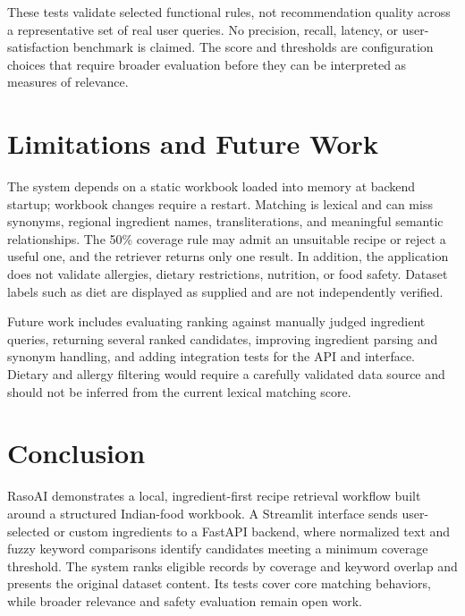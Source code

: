 \documentclass[conference]{IEEEtran}
\begin{document}
These tests validate selected functional rules, not recommendation quality across a representative set of real user queries. No precision, recall, latency, or user-satisfaction benchmark is claimed. The score and thresholds are configuration choices that require broader evaluation before they can be interpreted as measures of relevance.

\section{Limitations and Future Work}
The system depends on a static workbook loaded into memory at backend startup; workbook changes require a restart. Matching is lexical and can miss synonyms, regional ingredient names, transliterations, and meaningful semantic relationships. The 50\% coverage rule may admit an unsuitable recipe or reject a useful one, and the retriever returns only one result. In addition, the application does not validate allergies, dietary restrictions, nutrition, or food safety. Dataset labels such as diet are displayed as supplied and are not independently verified.

Future work includes evaluating ranking against manually judged ingredient queries, returning several ranked candidates, improving ingredient parsing and synonym handling, and adding integration tests for the API and interface. Dietary and allergy filtering would require a carefully validated data source and should not be inferred from the current lexical matching score.

\section{Conclusion}
RasoAI demonstrates a local, ingredient-first recipe retrieval workflow built around a structured Indian-food workbook. A Streamlit interface sends user-selected or custom ingredients to a FastAPI backend, where normalized text and fuzzy keyword comparisons identify candidates meeting a minimum coverage threshold. The system ranks eligible records by coverage and keyword overlap and presents the original dataset content. Its tests cover core matching behaviors, while broader relevance and safety evaluation remain open work.
\end{document}
